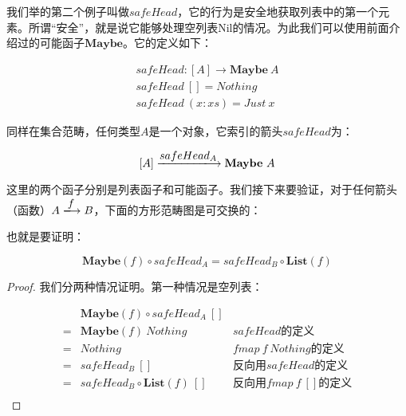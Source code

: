 \documentclass{article}
\begin{document}
\begin{example}
我们举的第二个例子叫做$safeHead$，它的行为是安全地获取列表中的第一个元素。所谓“安全”，就是说它能够处理空列表Nil的情况。为此我们可以使用前面介绍过的可能函子$\mathbf{Maybe}$。它的定义如下：

\[
\begin{array}{l}
safeHead : [A] \to \mathbf{Maybe}\ A \\
safeHead\ [] = Nothing \\
safeHead\ (x:xs) = Just\ x
\end{array}
\]

同样在集合范畴，任何类型$A$是一个对象，它索引的箭头$safeHead$为：

\[
[A] \arrowto{safeHead_A} \mathbf{Maybe}\ A
\]

这里的两个函子分别是列表函子和可能函子。我们接下来要验证，对于任何箭头（函数）$A \arrowto{f} B$，下面的方形范畴图是可交换的：

\begin{center}
\end{center}

也就是要证明：

\[
  \mathbf{Maybe}(f) \circ safeHead_A = safeHead_B \circ \mathbf{List}(f)
\]

\begin{proof}
我们分两种情况证明。第一种情况是空列表：

\[
\begin{array}{cll}
  & \mathbf{Maybe}(f) \circ safeHead_A\ [] & \\
= & \mathbf{Maybe}(f)\ Nothing & \text{$safeHead$的定义} \\
= & Nothing & \text{$fmap\ f\ Nothing$的定义} \\
= & safeHead_B\ [] & \text{反向用$safeHead$的定义} \\
= & safeHead_B \circ \mathbf{List}(f)\ [] & \text{反向用$fmap\ f\ []$的定义} \\
\end{array}
\]


\end{proof}
\end{example}
\end{document}
